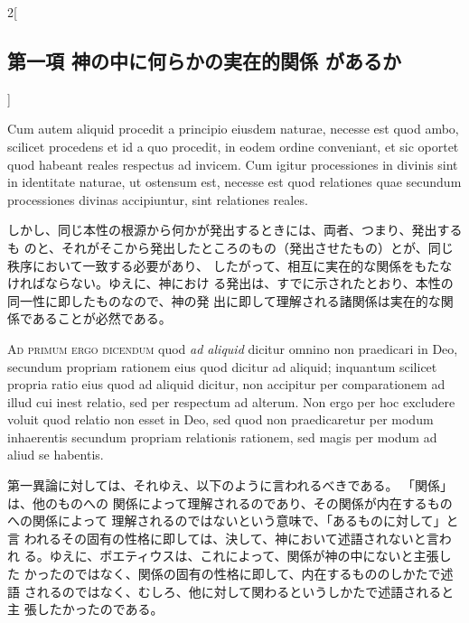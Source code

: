 \documentclass[paper=a4paper,fontsize=10pt,jafontsize=9pt,titlepage]{jlreq}
\begin{document}
\begin{paracol}{2}[\subsection{第一項 神の中に何らかの実在的関係 があるか}]
\switchcolumn*


Cum autem aliquid procedit a
principio eiusdem naturae, necesse est quod ambo, scilicet procedens et
id a quo procedit, in eodem ordine conveniant, et sic oportet quod
habeant reales respectus ad invicem. Cum igitur processiones in divinis
sint in identitate naturae, ut ostensum est, necesse est quod relationes
quae secundum processiones divinas accipiuntur, sint relationes reales.


\switchcolumn


しかし、同じ本性の根源から何かが発出するときには、両者、つまり、発出するも
 のと、それがそこから発出したところのもの（発出させたもの）とが、同じ秩序において一致する必要があり、
 したがって、相互に実在的な関係をもたなければならない。ゆえに、神におけ
 る発出は、すでに示されたとおり、本性の同一性に即したものなので、神の発
 出に即して理解される諸関係は実在的な関係であることが必然である。


\switchcolumn*[\subsection{ad.1}]


{\scshape Ad primum ergo dicendum} quod {\itshape ad aliquid} dicitur omnino non praedicari in
Deo, secundum propriam rationem eius quod dicitur ad aliquid; inquantum
scilicet propria ratio eius quod ad aliquid dicitur, non accipitur per
comparationem ad illud cui inest relatio, sed per respectum ad
alterum. Non ergo per hoc excludere voluit quod relatio non esset in
Deo, sed quod non praedicaretur per modum inhaerentis secundum propriam
relationis rationem, sed magis per modum ad aliud se habentis.


\switchcolumn


第一異論に対しては、それゆえ、以下のように言われるべきである。
「関係」は、他のものへの
 関係によって理解されるのであり、その関係が内在するものへの関係によって
 理解されるのではないという意味で、「あるものに対して」と言
 われるその固有の性格に即しては、決して、神において述語されないと言われ
 る。ゆえに、ボエティウスは、これによって、関係が神の中にないと主張した
 かったのではなく、関係の固有の性格に即して、内在するもののしかたで述語
 されるのではなく、むしろ、他に対して関わるというしかたで述語されると主
 張したかったのである。


\switchcolumn*[\subsection{ad.2}]



\end{paracol}
\end{document}
